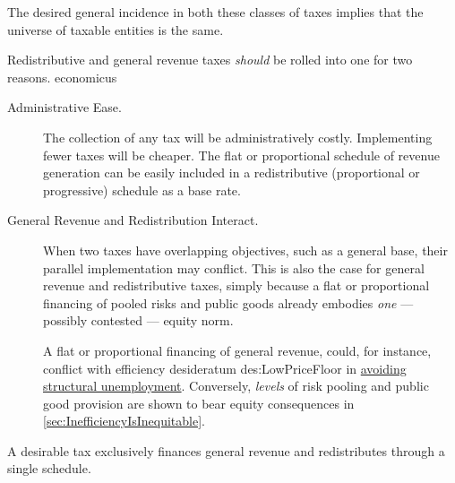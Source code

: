 The desired general incidence in both these classes of taxes implies that the universe of taxable entities is the same. 

Redistributive and general revenue taxes \emph{should} be rolled into one for two reasons.
economicus
\begin{description}
	\item[Administrative Ease.] The collection of any tax will be administratively costly. Implementing fewer taxes will be cheaper. The flat or proportional schedule of revenue generation can be easily included in a redistributive (proportional or progressive) schedule as a base rate. 
	\item[General Revenue and Redistribution Interact.] When two taxes have overlapping objectives, such as a general base, their parallel implementation may conflict. This is also the case for general revenue and redistributive taxes, simply because a flat or proportional financing of pooled risks and public goods already embodies \emph{one} --- possibly contested --- equity norm. 
	
	A flat or proportional financing of general revenue, could, for instance, conflict with efficiency desideratum	{des:LowPriceFloor} in \hyperref[des:LowPriceFloor]{avoiding structural unemployment}. Conversely, \emph{levels} of risk pooling and public good provision are shown to bear equity consequences in \autoref{sec:InefficiencyIsInequitable}.
\end{description}

\begin{desideratum}
	A desirable tax exclusively finances general revenue and redistributes through a single schedule.
	\label{des:redistribution-n-revenue-are-one}
\end{desideratum}

